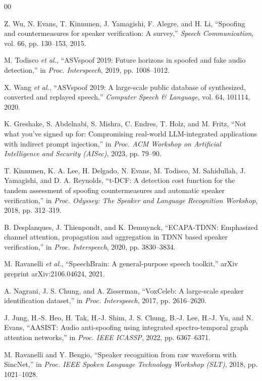 \documentclass[conference]{IEEEtran}
\begin{document}
\begin{thebibliography}{00}

Z. Wu, N. Evans, T. Kinnunen, J. Yamagishi, F. Alegre, and H. Li,
``Spoofing and countermeasures for speaker verification: A survey,''
\emph{Speech Communication}, vol. 66, pp. 130--153, 2015.

M. Todisco \emph{et al.},
``ASVspoof 2019: Future horizons in spoofed and fake audio detection,''
in \emph{Proc. Interspeech}, 2019, pp. 1008--1012.

X. Wang \emph{et al.},
``ASVspoof 2019: A large-scale public database of synthesized, converted and
replayed speech,'' \emph{Computer Speech \& Language}, vol. 64, 101114, 2020.

K. Greshake, S. Abdelnabi, S. Mishra, C. Endres, T. Holz, and M. Fritz,
``Not what you've signed up for: Compromising real-world LLM-integrated
applications with indirect prompt injection,''
in \emph{Proc. ACM Workshop on Artificial Intelligence and Security (AISec)},
2023, pp. 79--90.

T. Kinnunen, K. A. Lee, H. Delgado, N. Evans, M. Todisco, M. Sahidullah,
J. Yamagishi, and D. A. Reynolds,
``t-DCF: A detection cost function for the tandem assessment of spoofing
countermeasures and automatic speaker verification,''
in \emph{Proc. Odyssey: The Speaker and Language Recognition Workshop}, 2018,
pp. 312--319.

B. Desplanques, J. Thienpondt, and K. Demuynck,
``ECAPA-TDNN: Emphasized channel attention, propagation and aggregation in
TDNN based speaker verification,''
in \emph{Proc. Interspeech}, 2020, pp. 3830--3834.

M. Ravanelli \emph{et al.},
``SpeechBrain: A general-purpose speech toolkit,''
arXiv preprint arXiv:2106.04624, 2021.

A. Nagrani, J. S. Chung, and A. Zisserman,
``VoxCeleb: A large-scale speaker identification dataset,''
in \emph{Proc. Interspeech}, 2017, pp. 2616--2620.

J. Jung, H.-S. Heo, H. Tak, H.-J. Shim, J. S. Chung, B.-J. Lee, H.-J. Yu, and
N. Evans,
``AASIST: Audio anti-spoofing using integrated spectro-temporal graph attention
networks,'' in \emph{Proc. IEEE ICASSP}, 2022, pp. 6367--6371.

M. Ravanelli and Y. Bengio,
``Speaker recognition from raw waveform with SincNet,''
in \emph{Proc. IEEE Spoken Language Technology Workshop (SLT)}, 2018,
pp. 1021--1028.


\end{thebibliography}
\end{document}

